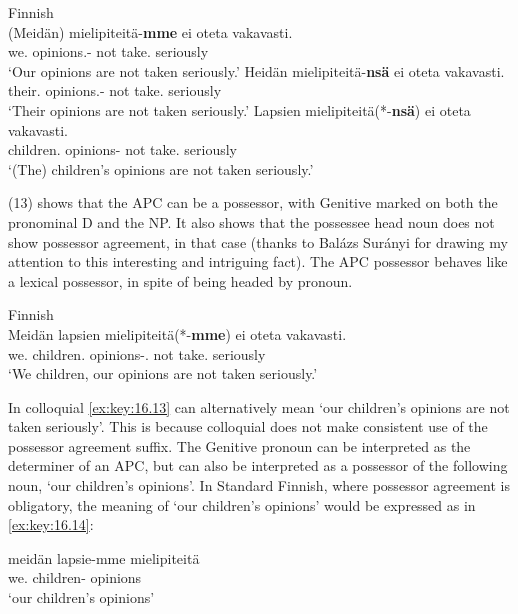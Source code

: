 \documentclass[output=paper]{langsci/langscibook}
\begin{document}
\ea Finnish\\\label{ex:key:16.12}
	\ea
		\gll (Meidän) mielipiteitä-\textbf{mme} ei   oteta   vakavasti.\\
        \hphantom{(}we.\Gen{} opinions.\Part{}-\Fpl{} not take.\Pass{} seriously\\
		\glt    `Our opinions are not taken seriously.'
	\ex
		\gll Heidän      mielipiteitä-\textbf{nsä} ei oteta  vakavasti.\\
			their.\Gen{} opinions.\Part{}-\Third{} not take.\Pass{} seriously\\
		\glt    `Their opinions are not taken seriously.'
	\ex
		\gll Lapsien mielipiteitä(*-\textbf{nsä})  ei  oteta           vakavasti.\\
			children.\Gen{} opinions-\Third{} not take.\Pass{} seriously\\
		\glt    `(The) children’s opinions are not taken seriously.'
	\z
\z

(13) shows that the \gls{APC} can be a possessor, with Genitive marked on both
the pronominal D and the NP. It also shows that the possessee head noun does
not show possessor agreement, in that case (thanks to Balázs Surányi for
drawing my attention to this interesting and intriguing fact). The \gls{APC}
possessor behaves like a lexical possessor, in spite of being headed by
pronoun.

\ea Finnish\\\label{ex:key:16.13}
    \sn
	\gll Meidän  lapsien   mielipiteitä(*-\textbf{mme}) ei  oteta         vakavasti.\\
		we.\Gen{} children.\Gen{} opinions-\Part.\Fpl{} not take.\Pass{} seriously\\
	\glt    `We children, our opinions are not taken seriously.'
\z

In colloquial  \eqref{ex:key:16.13} can alternatively mean ‘our children’s opinions are
not taken seriously’. This is because colloquial  does not make
consistent use of the possessor agreement suffix. The Genitive pronoun can be
interpreted as the determiner of an \gls{APC}, but can also be interpreted as a
possessor of the following noun, ‘our children’s opinions’. In Standard
Finnish, where possessor agreement is obligatory, the meaning of ‘our
children’s opinions’ would be expressed as in \eqref{ex:key:16.14}:

\ea
    \label{ex:key:16.14} 
    \sn
    \gll meidän   lapsie-mme mielipiteitä \\
        we.\Gen{} children-\Fpl{} opinions\\
    \glt    `our children’s opinions'
\z
\end{document}

